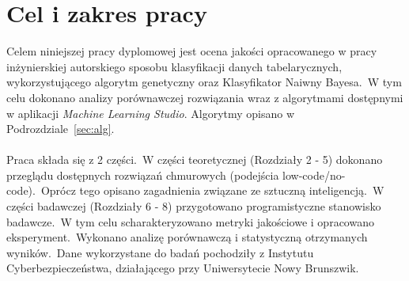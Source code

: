 \section{Cel i zakres pracy}
Celem niniejszej pracy dyplomowej jest ocena jakości opracowanego w pracy inżynierskiej autorskiego sposobu klasyfikacji danych tabelarycznych, wykorzystującego algorytm genetyczny oraz Klasyfikator Naiwny Bayesa.\ W tym celu dokonano analizy porównawczej rozwiązania wraz z algorytmami dostępnymi w aplikacji \textit{Machine Learning Studio}. Algorytmy opisano w Podrozdziale~\ref{sec:alg}.
\\ \\
Praca składa się z 2 części.\ W części teoretycznej (Rozdziały 2 - 5) dokonano przeglądu dostępnych rozwiązań chmurowych (podejścia low-code/no-code).\ Oprócz tego opisano zagadnienia związane ze sztuczną inteligencją.\ W części badawczej (Rozdziały 6 - 8) przygotowano programistyczne stanowisko badawcze.\ W tym celu scharakteryzowano metryki jakościowe i opracowano eksperyment.\ Wykonano analizę porównawczą i statystyczną otrzymanych wyników.\ Dane wykorzystane do badań pochodziły z Instytutu Cyberbezpieczeństwa, działającego przy Uniwersytecie Nowy Brunszwik.

